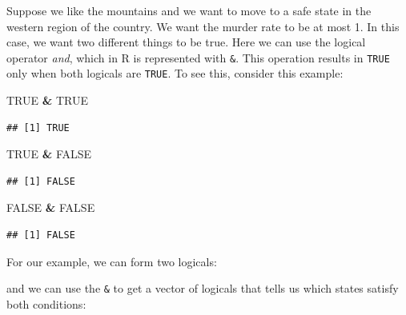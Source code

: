 \documentclass[
]{article}
\newenvironment{Shaded}{\begin{snugshade}}{\end{snugshade}}
\newcommand{\ConstantTok}[1]{\textcolor[rgb]{0.56,0.35,0.01}{#1}}
\newcommand{\DecValTok}[1]{\textcolor[rgb]{0.00,0.00,0.81}{#1}}
\newcommand{\NormalTok}[1]{#1}
\newcommand{\OtherTok}[1]{\textcolor[rgb]{0.56,0.35,0.01}{#1}}
\newcommand{\SpecialCharTok}[1]{\textcolor[rgb]{0.81,0.36,0.00}{\textbf{#1}}}
\newcommand{\StringTok}[1]{\textcolor[rgb]{0.31,0.60,0.02}{#1}}
\begin{document}
Suppose we like the mountains and we want to move to a safe state in the
western region of the country. We want the murder rate to be at most 1.
In this case, we want two different things to be true. Here we can use
the logical operator \emph{and}, which in R is represented with
\texttt{\&}. This operation results in \texttt{TRUE} only when both
logicals are \texttt{TRUE}. To see this, consider this example:

\begin{Shaded}
\begin{Highlighting}[]
\ConstantTok{TRUE} \SpecialCharTok{\&} \ConstantTok{TRUE}
\end{Highlighting}
\end{Shaded}

\begin{verbatim}
## [1] TRUE
\end{verbatim}

\begin{Shaded}
\begin{Highlighting}[]
\ConstantTok{TRUE} \SpecialCharTok{\&} \ConstantTok{FALSE}
\end{Highlighting}
\end{Shaded}

\begin{verbatim}
## [1] FALSE
\end{verbatim}

\begin{Shaded}
\begin{Highlighting}[]
\ConstantTok{FALSE} \SpecialCharTok{\&} \ConstantTok{FALSE}
\end{Highlighting}
\end{Shaded}

\begin{verbatim}
## [1] FALSE
\end{verbatim}

For our example, we can form two logicals:

\begin{Shaded}
\end{Shaded}

and we can use the \texttt{\&} to get a vector of logicals that tells us
which states satisfy both conditions:
\end{document}
